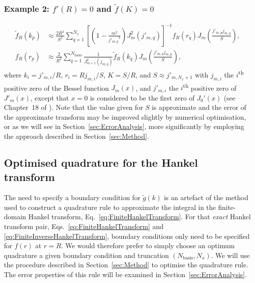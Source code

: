 \documentclass[aip,amsmath,amssymb,reprint,twocolumn]{revtex4-1}
\newcommand{\Nbasis}{{N_{\text{basis}}}}
\newcommand{\Nx}{{N_{x}}}
\begin{document}
\begin{widetext}
\subsubsection{Example 2: $f'(R)=0$ and $\tilde{f}(K)=0$}
\label{sec:BoundaryConditionsNeumannDirichlet}

\begin{align}
  \tilde{f}_R(k_p) &\approx \frac{2 R^2}{S^2} \sum_{q=1}^{\Nx} \left[\left(1 - \frac{m^2}{{j'_{m,q}}^2}\right) J_m^2(j'_{m,q})\right]^{-1} f_R(r_q) J_m\left(\frac{j'_{m,p}j_{m,q}}{S} \right),\\
  f_R(r_p) &\approx \frac{2}{R^2} \sum_{q=1}^{\Nbasis} \frac{1}{J_{m+1}^2(j_{m,q})} \tilde{f}_R(k_q) J_m\left(\frac{j'_{m,q} j_{m,p}}{S}\right),
\end{align}
where $k_i = j'_{m,i}/R$, $r_i = R j_{m,i}/S$, $K = S/R$, and $S \approx j'_{m, \Nx+1}$ with $j_{m,i}$ the $i$\textsuperscript{th} positive zero of the Bessel function $J_m(x)$, and $j'_{m,i}$ the $i$\textsuperscript{th} positive zero of $J'_{m}(x)$, except that $x=0$ is considered to be the first zero of $J_0'(x)$ (see Chapter~18 of \citet{Watson:1966}).  Note that the value given for $S$ is approximate and the error of the approximate transform may be improved slightly by numerical optimisation, or as we will see in Section~\ref{sec:ErrorAnalysis}, more significantly by employing the approach described in Section~\ref{sec:Method}.

\end{widetext}

\subsection{Optimised quadrature for the Hankel transform}
\label{sec:OptimisedQuadrature}

The need to specify a boundary condition for $\tilde{g}(k)$ is an artefact of the method used to construct a quadrature rule to approximate the integral in the finite-domain Hankel transform, Eq.~\eqref{eq:FiniteHankelTransform}.  For that \emph{exact} Hankel transform pair, Eqs.~\eqref{eq:FiniteHankelTransform} and \eqref{eq:FiniteInverseHankelTransform}, boundary conditions only need to be specified for $f(r)$ at $r=R$.  We would therefore prefer to simply choose an optimum quadrature a given boundary condition and truncation $(\Nbasis, \Nx)$.  We will use the procedure described in Section~\ref{sec:Method} to optimise the quadrature rule.  The error properties of this rule will be examined in Section~\ref{sec:ErrorAnalysis}.
\end{document}
